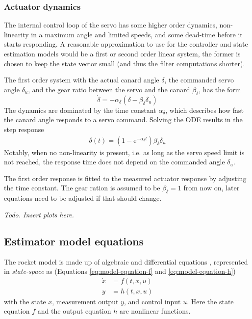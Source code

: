 \subsubsection{Actuator dynamics}
The internal control loop of the servo has some higher order dynamics, non-linearity in a maximum angle and limited speeds, and some dead-time before it starts responding.
A reasonable approximation to use for the controller and state estimation models would be a first or second order linear system, the former is chosen to keep the state vector small (and thus the filter computations shorter).

The first order system with the actual canard angle $\delta$, the commanded servo angle $\delta_u$, and the gear ratio between the servo and the canard $\beta_\delta$, has the form
\begin{equation}
    \dot \delta = -\alpha_\delta (\delta - \beta_\delta\delta_u)
\end{equation}
The dynamics are dominated by the time constant $\alpha_\delta$, which describes how fast the canard angle responds to a servo command. 
Solving the ODE results in the step response
\begin{align}
    \delta(t) = (1-\mathrm{e}^{-\alpha_\delta t}) \beta_\delta \delta_u
\end{align}
Notably, when no non-linearity is present, i.e. as long as the servo speed limit is not reached, the response time does not depend on the commanded angle $\delta_u$.

The first order response is fitted to the measured actuator response by adjusting the time constant.
The gear ration is assumed to be $\beta_\delta = 1$ from now on, later equations need to be adjusted if that should change. 

\textit{Todo. Insert plots here.}


\subsection{Estimator model equations}
\label{sec:model_estimator}
The rocket model is made up of algebraic and differential equations \cite{zipfel2007, lewis2008, stevens2015}, represented in \textit{state-space} as \cite{lewis2008, stevens2015} (Equations \ref{eq:model-equation-f} and \ref{eq:model-equation-h})
\begin{align}
    \dot x &= f(t, x, u) \nonumber \\  y &= h(t, x, u) \nonumber
\end{align}  
with the state $x$, measurement output $y$, and control input $u$.
Here the state equation $f$ and the output equation $h$ are nonlinear functions.


